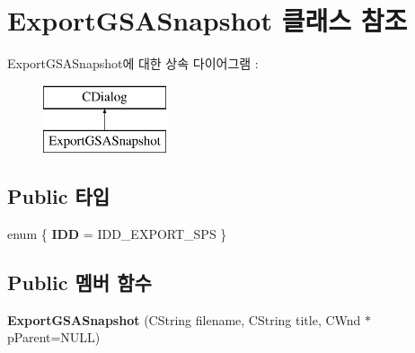\hypertarget{class_export_g_s_a_snapshot}{}\section{Export\+G\+S\+A\+Snapshot 클래스 참조}
\label{class_export_g_s_a_snapshot}
Export\+G\+S\+A\+Snapshot에 대한 상속 다이어그램 \+: \begin{figure}[H]
\begin{center}
\leavevmode
\includegraphics[height=2.000000cm]{class_export_g_s_a_snapshot}
\end{center}
\end{figure}
\subsection*{Public 타입}
\begin{DoxyCompactItemize}
\item 
\mbox{\label{class_export_g_s_a_snapshot_ab3257151782aa1db395f22cd47b06c28}} 
enum \{ {\bfseries I\+DD} = I\+D\+D\+\_\+\+E\+X\+P\+O\+R\+T\+\_\+\+S\+PS
 \}
\end{DoxyCompactItemize}
\subsection*{Public 멤버 함수}
\begin{DoxyCompactItemize}
\item 
\mbox{\label{class_export_g_s_a_snapshot_ae7d2ef11752f80bfd3c3a13a7c1215ad}} 
{\bfseries Export\+G\+S\+A\+Snapshot} (C\+String filename, C\+String title, C\+Wnd $\ast$p\+Parent=N\+U\+LL)
\end{DoxyCompactItemize}
